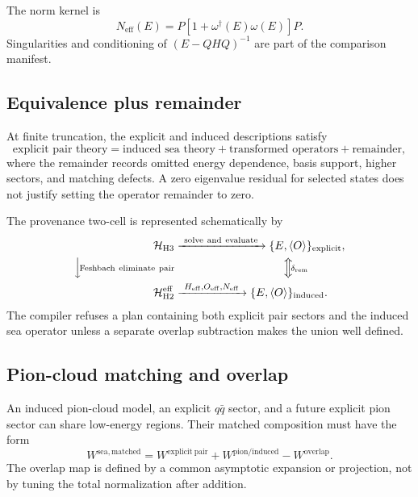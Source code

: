 \documentclass[11pt]{article}
\newcommand{\Hil}{\mathcal H}
\newcommand{\eff}{\mathrm{eff}}
\begin{document}
The norm kernel is
\begin{equation}
 N_{\eff}(E)
 =P\left[1+\omega^{\dagger}(E)\omega(E)\right]P.
\end{equation}
Singularities and conditioning of \((E-QHQ)^{-1}\) are part of the
comparison manifest.

\subsection{Equivalence plus remainder}

At finite truncation, the explicit and induced descriptions satisfy
\begin{equation}
 \text{explicit pair theory}
 =
 \text{induced sea theory}
 +\text{transformed operators}
 +\text{remainder},
 \label{eq:explicit-induced}
\end{equation}
where the remainder records omitted energy dependence, basis support, higher
sectors, and matching defects.  A zero eigenvalue residual for selected states
does not justify setting the operator remainder to zero.

The provenance two-cell is represented schematically by
\begin{equation}
\begin{aligned}
 \Hil_{\mathrm{H3}}
 &\xrightarrow{\ \mathrm{solve\ and\ evaluate}\ }
 \{E,\langle O\rangle\}_{\mathrm{explicit}},\\
 \Big\downarrow\!\scriptstyle{\mathrm{Feshbach\ eliminate\ pair}}
 &\hspace{3.4cm}\Big\Updownarrow\!\scriptstyle{\delta_{\mathrm{rem}}}\\
 \Hil_{\mathrm{H2}}^{\eff}
 &\xrightarrow{\ H_{\eff},O_{\eff},N_{\eff}\ }
 \{E,\langle O\rangle\}_{\mathrm{induced}}.
\end{aligned}
\end{equation}
The compiler refuses a plan containing both explicit pair sectors and the
induced sea operator unless a separate overlap subtraction makes the union
well defined.

\subsection{Pion-cloud matching and overlap}

An induced pion-cloud model, an explicit \(q\bar q\) sector, and a future
explicit pion sector can share low-energy regions.  Their matched composition
must have the form
\begin{equation}
 W^{\mathrm{sea,matched}}
 =W^{\mathrm{explicit\ pair}}
 +W^{\mathrm{pion/induced}}
 -W^{\mathrm{overlap}}.
 \label{eq:sea-overlap}
\end{equation}
The overlap map is defined by a common asymptotic expansion or projection, not
by tuning the total normalization after addition.
\end{document}
